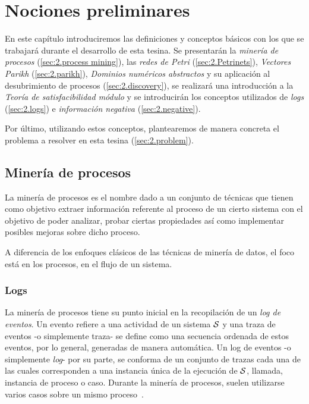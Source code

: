 \chapter[Nociones preliminares]{Nociones preliminares}
\label{chap:2}

En este capítulo introduciremos las definiciones y conceptos básicos con los que se trabajará durante el desarrollo de 
esta tesina. Se presentarán la \textit{minería de procesos} (\autoref{sec:2.process mining}), 
las \textit{redes de Petri} (\autoref{sec:2.Petrinets}), \textit{Vectores Parikh} (\autoref{sec:2.parikh}), 
\textit{Dominios numéricos abstractos} y su aplicación al desubrimiento de procesos (\autoref{sec:2.discovery}), 
se realizará una introducción a la \textit{Teoría de satisfacibilidad módulo} 
y se introducirán los conceptos utilizados de \textit{logs} (\autoref{sec:2.logs}) 
e \textit{información negativa} (\autoref{sec:2.negative}).

Por último, utilizando estos conceptos, plantearemos de manera concreta el problema a resolver en 
esta tesina (\autoref{sec:2.problem}).

\section{Minería de procesos} 
\label{sec:2.process mining}

La minería de procesos es el nombre dado a un conjunto de técnicas que tienen
como objetivo extraer información referente al proceso de un cierto sistema
con el objetivo de poder analizar, probar ciertas propiedades 
así como implementar posibles mejoras sobre dicho proceso.

A diferencia de los enfoques clásicos de las técnicas de minería de datos, el foco
está en los procesos, en el flujo de un sistema.

\subsection{Logs} 
\label{sec:2.logs}

La minería de procesos tiene su punto inicial en la recopilación de un \textit{log de eventos}. 
Un evento refiere a una actividad de un sistema $\mathcal{S}$ y
una traza de eventos -o simplemente traza- se define como una secuencia
ordenada de estos eventos, por lo general, generadas de manera automática.
Un log de eventos -o simplemente \textit{log}- por su parte, se conforma de un
conjunto de trazas cada una de las cuales corresponden a una instancia única 
de la ejecución de $\mathcal{S}$, llamada, instancia de proceso o caso.
Durante la minería de procesos, suelen utilizarse varios casos sobre un mismo proceso~\cite{Aalst2004}.

